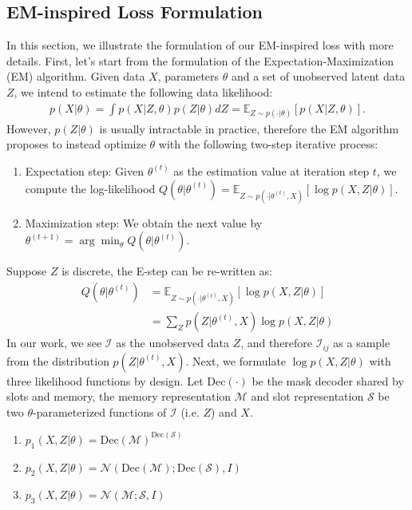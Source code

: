 \documentclass[10pt,twocolumn,letterpaper]{article}
\begin{document}
\begin{appendices}
\section{EM-inspired Loss Formulation}
In this section, we illustrate the formulation of our EM-inspired loss with more details. First, let's start from the formulation of the Expectation-Maximization (EM) algorithm.
Given data $X$, parameters $\theta$ and a set of unobserved latent data $Z$, we intend to estimate the following data likelihood:
\begin{align}
    p(X|\theta) =\int p(X|Z, \theta) p(Z|\theta) dZ =\mathbb{E}_{Z\sim p(\cdot|\theta)}[p(X|Z, \theta)].
\end{align}
However, $p(Z|\theta)$ is usually intractable in practice, therefore the EM algorithm proposes to instead optimize $\theta$ with the following two-step iterative process:

\begin{enumerate}
    \item Expectation step: Given $\theta^{(t)}$ as the estimation value at iteration step $t$, we compute the log-likelihood $Q(\theta|\theta^{(t)})=\mathbb{E}_{Z\sim p(\cdot|\theta^{(t)}, X)}[\log p(X, Z|\theta)]$.
    \item Maximization step: We obtain the next value by $\theta^{(t+1)}=\arg\min_\theta Q(\theta|\theta^{(t)})$.
\end{enumerate}
Suppose $Z$ is discrete, the E-step can be re-written as:
\begin{align}
    Q(\theta|\theta^{(t)}) &= \mathbb{E}_{Z\sim p(\cdot|\theta^{(t)}, X)}[\log p(X, Z|\theta)]\\
    &=\sum_Z p(Z|\theta^{(t)}, X) \log p(X, Z|\theta)
\end{align}
In our work, we see $\mathcal{I}$ as the unobserved data $Z$, and therefore $\mathcal{I}_{ij}$ as a sample from the distribution $p(Z|\theta^{(t)}, X)$. 
Next, we formulate $\log p(X, Z|\theta)$ with three likelihood functions by design. Let $\text{Dec}(\cdot)$ be the mask decoder shared by slots and memory, the memory representation $\mathcal{M}$ and slot representation $\mathcal{S}$ be two $\theta$-parameterized functions of $\mathcal{I}$ (i.e. $Z$) and $X$.

\begin{enumerate}
    \item $p_1(X, Z|\theta) = \text{Dec}(\mathcal{M})^{\text{Dec}(\mathcal{S})}$ 
    \item $p_2(X, Z|\theta)=\mathcal{N}(\text{Dec}(\mathcal{M});\text{Dec}(\mathcal{S}), I)$
    \item $p_3(X, Z|\theta)=\mathcal{N}(\mathcal{M};\mathcal{S}, I)$
\end{enumerate}


\end{appendices}
\end{document}
